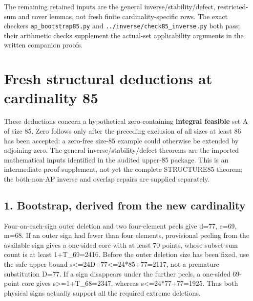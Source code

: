 \documentclass[10pt,a4paper]{article}
\theoremstyle{definition}
\begin{document}
The remaining retained inputs are the general inverse/stability/defect,\allowbreak{}
restricted-sum and cover lemmas,\allowbreak{} not fresh finite cardinality-specific
rows. The exact checkers \texttt{ap\_\allowbreak{}\allowbreak{}bootstrap85.py}
and \texttt{../\allowbreak{}inverse/\allowbreak{}check85\_\allowbreak{}\allowbreak{}inverse.py} both pass;
their arithmetic checks supplement the actual-set applicability
arguments in the written companion proofs.

\clearpage
\hypertarget{fresh-structural-deductions-at-cardinality-85}{%
\section{Fresh structural deductions at cardinality
85}\label{fresh-structural-deductions-at-cardinality-85}}

These deductions concern a hypothetical zero-containing \textbf{integral
feasible} set A of size 85. Zero follows only after the preceding
exclusion of all sizes at least 86 has been accepted: a zero-free
size-85 example could otherwise be extended by adjoining zero. The
general inverse/stability/defect theorems are the imported mathematical
inputs identified in the audited upper-85 package. This is an
intermediate proof supplement,\allowbreak{} not yet the complete STRUCTURE85 theorem;
the both-non-AP inverse and overlap repairs are supplied separately.

\hypertarget{bootstrap-derived-from-the-new-cardinality}{%
\subsection{1. Bootstrap,\allowbreak{} derived from the new
cardinality}\label{bootstrap-derived-from-the-new-cardinality}}

Four-on-each-sign outer deletion and two four-element peels give d=\allowbreak{}77,\allowbreak{}
e=\allowbreak{}69,\allowbreak{} m=\allowbreak{}68. If an outer sign had fewer than four elements,\allowbreak{} provisional
peeling from the available sign gives a one-sided core with at least 70
points,\allowbreak{} whose subset-sum count is at least 1+\allowbreak{}T\_\allowbreak{}69=\allowbreak{}2416. Before the
outer deletion size has been fixed,\allowbreak{} use the safe upper bound
s\textless=\allowbreak{}24\textbar D\textbar+\allowbreak{}77\textless=\allowbreak{}24*85+\allowbreak{}77=\allowbreak{}2117,\allowbreak{} not a
premature substitution \textbar D\textbar=\allowbreak{}77. If a sign disappears under
the further peels,\allowbreak{} a one-sided 69-point core gives
s\textgreater=\allowbreak{}1+\allowbreak{}T\_\allowbreak{}68=\allowbreak{}2347,\allowbreak{} whereas s\textless=\allowbreak{}24*77+\allowbreak{}77=\allowbreak{}1925. Thus both
physical signs actually support all the required extreme deletions.
\end{document}
